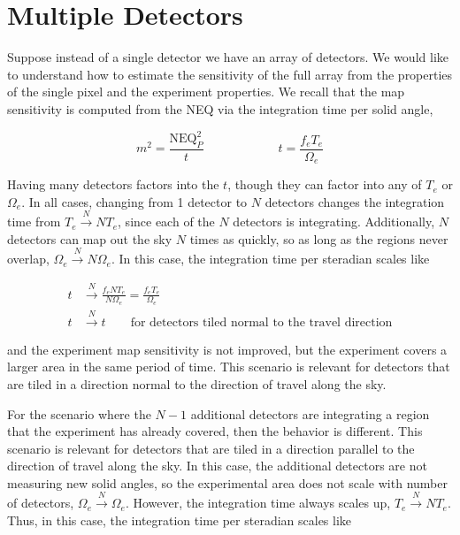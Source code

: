 \documentclass[twoside,10pt]{article}
\newcommand{\NEQ}[0]{\mathrm{NEQ}}
\begin{document}
\section{Multiple Detectors}
\label{sec:multiple_detectors}

Suppose instead of a single detector we have an array of detectors. We would
like to understand how to estimate the sensitivity of the full array from the
properties of the single pixel and the experiment properties. We recall that
the map sensitivity is computed from the NEQ via the integration time per
solid angle,

\begin{equation*}
    m^2 = \frac{\NEQ_P^2}{t}\qquad\qquad\qquad t = \frac{f_e T_e}{\Omega_e}
\end{equation*}

Having many detectors factors into the $t$, though they can factor into any of
$T_e$ or $\Omega_e$. In all cases, changing from 1 detector to $N$
detectors changes the integration time from $T_e \xrightarrow{N} NT_e$, since
each of the $N$ detectors is integrating. Additionally, $N$ detectors can map
out the sky $N$ times as quickly, so as long as the regions never overlap,
$\Omega_e \xrightarrow{N} N\Omega_e$. In this case, the integration time per
steradian scales like

\begin{align*}
    t & \xrightarrow{N} \frac{f_e N T_e}{N \Omega_e} = \frac{f_e T_e}{\Omega_e} \\
    t & \xrightarrow{N} t \qquad \text{for detectors tiled normal to the travel direction}
\end{align*}

and the experiment map sensitivity is not improved, but the experiment covers
a larger area in the same period of time. This scenario is relevant for
detectors that are tiled in a direction normal to the direction of travel
along the sky.

For the scenario where the $N - 1$ additional detectors are integrating a
region that the experiment has already covered, then the behavior is
different. This scenario is relevant for detectors that are tiled in a
direction parallel to the direction of travel along the sky. In this case, the
additional detectors are not measuring new solid angles, so the experimental
area does not scale with number of detectors, $\Omega_e \xrightarrow{N}
\Omega_e$. However, the integration time always scales up, $T_e
\xrightarrow{N} N T_e$. Thus, in this case, the integration time per steradian
scales like
\end{document}
